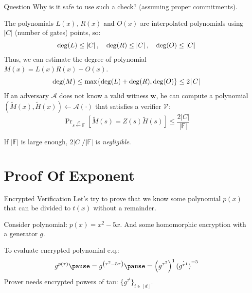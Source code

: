 \documentclass{zkdl-presentation-template}
\begin{document}
    \begin{frame}
        \begin{alertblock}{Question}
            Why is it safe to use such a check? (assuming proper commitments).
        \end{alertblock}

        The polynomials $L(x)$, $R(x)$ and $O(x)$ are interpolated polynomials using 
        $\left| C \right|$ (number of gates) points, so:
        \vspace{-5pt}
        \begin{equation*}
            \deg(L) \le \left| C \right|, \quad
            \deg(R) \le \left| C \right|, \quad 
            \deg(O) \le \left| C \right|
            \vspace{-5pt}
        \end{equation*}
        \pause
        Thus, we can estimate the degree of polynomial $M(x) = L(x)R(x) - O(x)$.
        \vspace{-5pt}
        \begin{equation*}
            \deg(M) \leq \max\{\deg(L) + \deg(R), \deg(O)\} \leq 2 \left| C \right|
            \vspace{-5pt}
        \end{equation*}
        \pause
        If an adversary $\mathcal{A}$ does not know a valid witness $\boldsymbol{w}$, he can compute a
        polynomial $(\widetilde{M}(x), \widetilde{H}(x)) \gets \mathcal{A}(\cdot)$ that satisfies a verifier 
        $\mathcal{V}$:
        \vspace{-5pt}
        \begin{equation*}
            \mathop{\text{Pr}}_{s \xleftarrow{R} \mathbb{F}}[\widetilde{M}(s) = Z(s)\widetilde{H}(s)] \leq \frac{2 \left| C \right|}{|\mathbb{F}|}
        \end{equation*}

        If $|\mathbb{F}|$ is large enough, $2|C|/|\mathbb{F}|$ is \textit{negligible}.
    \end{frame}

    \section{Proof Of Exponent}

    \begin{frame}{Encrypted Verification}
        Let's try to prove that we know some polynomial $p(x)$ that can be divided to $t(x)$ without a 
        remainder.

        \pause
        Consider polynomial: $p(x) = x^2 - 5x$. \pause And some homomorphic encryption with a
        generator $g$.
        
        To evaluate encrypted polynomial e.q.:
        {\large
        \begin{equation*}
            g^{p(\tau)} \pause = g^{\left( \tau^2 - 5\tau \right)} \pause = \left( g^{\tau^2} \right)^1 \dot {\left( g^{\tau^1} \right)}^{-5}
        \end{equation*}}
        Prover needs encrypted powers of tau: $\{g^{\tau^i}\}_{i \in [d]}$.
    \end{frame}
\end{document}
